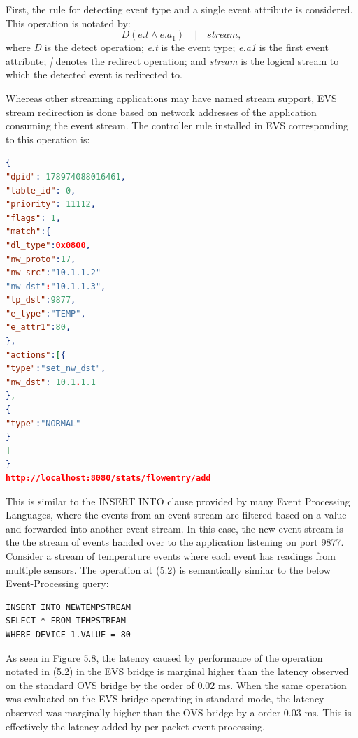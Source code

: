 First, the rule for detecting event type and  a single event attribute is considered. This operation is notated by: \begin{equation} D(e.t  \wedge e.a_1) \quad | \quad stream,  \end{equation}
where \textit{D} is the detect operation; \newline
\textit{e.t} is the event type; \newline
\textit{e.a1} is the first event attribute; \newline
\textit{|} denotes the redirect operation; \newline
and \textit{stream} is the logical stream to which the detected event is redirected to. \newline \newline

Whereas other streaming applications may have named stream support, EVS stream redirection is done based on network addresses of the application consuming the event stream. The controller rule installed in EVS corresponding to this operation is:

\begin{lstlisting}[language=json,firstnumber=1]
{
"dpid": 178974088016461,
"table_id": 0,
"priority": 11112,
"flags": 1,
"match":{
"dl_type":0x0800,
"nw_proto":17,
"nw_src":"10.1.1.2"
"nw_dst":"10.1.1.3",
"tp_dst":9877,
"e_type":"TEMP",
"e_attr1":80,
},
"actions":[{
"type":"set_nw_dst",
"nw_dst": 10.1.1.1
},
{
"type":"NORMAL"
}
]
}
http://localhost:8080/stats/flowentry/add \end{lstlisting}

This is similar to the INSERT INTO clause provided by many Event Processing Languages, where the events from an event stream are filtered based on a value and forwarded into another event stream. In this case, the new event stream is the the stream of events handed over to the application listening on port 9877. Consider a stream of temperature events where each event has readings from multiple sensors. The operation at (5.2) is semantically similar to the below Event-Processing  query:

\begin{verbatim}
INSERT INTO NEWTEMPSTREAM
SELECT * FROM TEMPSTREAM
WHERE DEVICE_1.VALUE = 80
\end{verbatim}

As seen in Figure 5.8, the latency caused by performance of the operation notated in (5.2) in the EVS bridge is marginal higher than the latency observed on the standard OVS bridge by the order of 0.02 ms. When the same operation was evaluated on the EVS bridge operating in standard mode, the latency observed was marginally higher than the OVS bridge by a order 0.03 ms. This is effectively the latency added by per-packet event processing. 

